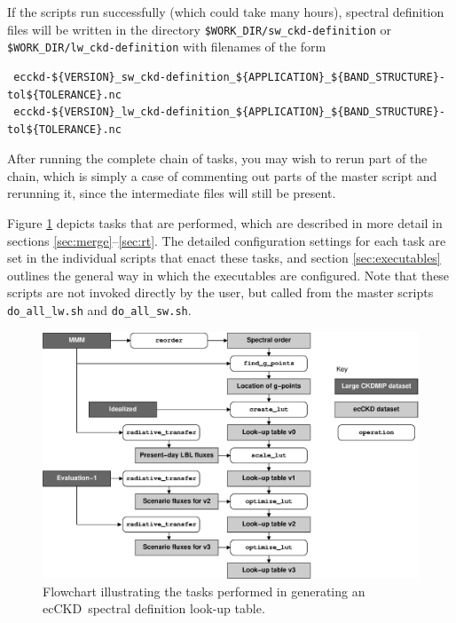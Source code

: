 \documentclass[a4,oneside]{article}
\def\codesize{\small}
\newcommand{\ecckd}{ecCKD}
\def\codesize{\small}
\def\code#1{{\codesize\texttt{#1}}}
\begin{document}
If the scripts run successfully (which could take many hours),
spectral definition files will be written in the directory
\code{\$WORK\_DIR/sw\_ckd-definition} or
\code{\$WORK\_DIR/lw\_ckd-definition} with filenames of the form
\begin{lstlisting}
 ecckd-${VERSION}_sw_ckd-definition_${APPLICATION}_${BAND_STRUCTURE}-tol${TOLERANCE}.nc
 ecckd-${VERSION}_lw_ckd-definition_${APPLICATION}_${BAND_STRUCTURE}-tol${TOLERANCE}.nc
\end{lstlisting}
After running the complete chain of tasks, you may wish to rerun part
of the chain, which is simply a case of commenting out parts of the
master script and rerunning it, since the intermediate files will
still be present.

Figure \ref{fig:flowchart} depicts tasks that are performed, which are
described in more detail in sections
\ref{sec:merge}--\ref{sec:rt}. The detailed configuration settings for
each task are set in the individual scripts that enact these tasks,
and section \ref{sec:executables} outlines the general way in which
the executables are configured.  Note that these scripts are not
invoked directly by the user, but called from the master scripts
\code{do\_all\_lw.sh} and \code{do\_all\_sw.sh}.

\begin{figure}[tb!]
\includegraphics[width=\columnwidth]{flowchart.eps}
\caption{\label{fig:flowchart}Flowchart illustrating the tasks
  performed in generating an \ecckd\ spectral definition look-up
  table.}
\end{figure}
\end{document}
